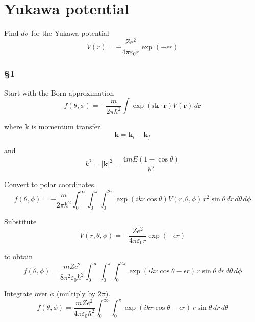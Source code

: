 

\section*{Yukawa potential}

Find $d\sigma$ for the Yukawa potential
\begin{equation*}
V(r)=-\frac{Ze^2}{4\pi\varepsilon_0r}\exp(-\epsilon r)
\end{equation*}

\subsubsection*{\S1}

Start with the Born approximation
\begin{equation*}
f(\theta,\phi)=-\frac{m}{2\pi\hbar^2}
\int\exp(i\mathbf k\cdot\mathbf r)V(\mathbf r)\,d\mathbf r
\end{equation*}

where $\mathbf k$ is momentum transfer
\begin{equation*}
\mathbf k=\mathbf k_i-\mathbf k_f
\end{equation*}

and
\begin{equation*}
k^2=|\mathbf k|^2=\frac{4mE(1-\cos\theta)}{\hbar^2}
\end{equation*}

Convert to polar coordinates.
\begin{equation*}
f(\theta,\phi)
=-\frac{m}{2\pi\hbar^2}
\int_0^\infty
\int_0^\pi
\int_0^{2\pi}
\exp(ikr\cos\theta)V(r,\theta,\phi)
\,r^2\sin\theta\,dr\,d\theta\,d\phi
\end{equation*}

Substitute
\begin{equation*}
V(r,\theta,\phi)=-\frac{Ze^2}{4\pi\varepsilon_0r}\exp(-\epsilon r)
\end{equation*}

to obtain
\begin{equation*}
f(\theta,\phi)
=\frac{mZe^2}{8\pi^2\varepsilon_0\hbar^2}
\int_0^\infty
\int_0^\pi
\int_0^{2\pi}
\exp(ikr\cos\theta-\epsilon r)
\,r\sin\theta\,dr\,d\theta\,d\phi
\end{equation*}

Integrate over $\phi$ (multiply by $2\pi$).
\begin{equation*}
f(\theta,\phi)
=\frac{mZe^2}{4\pi\varepsilon_0\hbar^2}
\int_0^\infty
\int_0^\pi
\exp(ikr\cos\theta-\epsilon r)
\,r\sin\theta\,dr\,d\theta
\end{equation*}


